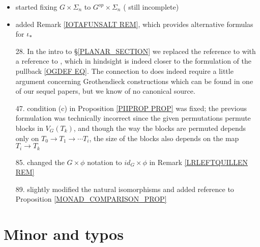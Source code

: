 \documentclass{article}
\begin{document}
\begin{itemize}
	\item started fixing $G \times \Sigma_n$ 
	to 
	$G^{op} \times \Sigma_n$
	({\color{red} still incomplete})
	
	\item added Remark \ref{IOTAFUNSALT REM},
	which provides alternative formulas for
	$\iota_{\**}$
	
	\item[28.] In the intro to \S \ref{PLANAR_SECTION}
	we replaced the reference to 
	\cite[Prop. 5.47]{Pe17}
	with a reference to 
	\cite[Def. 5.44]{Pe17},
	which in hindsight is indeed closer 
	to the formulation of the pullback \eqref{OGDEF EQ}.
	The connection to \cite[Prop. 5.47]{Pe17}
	does indeed require a little argument concerning Grothendieck constructions {\color{red} which can be found in one of our sequel papers}, 
	but we know of no canonical source.
	
	\item[47.] condition (c) in Proposition \ref{PIIPROP PROP}
	was fixed; the previous formulation was technically incorrect since the given permutations
	permute blocks in $V_G(T_k)$,
	and though the way the blocks
	are permuted depends only on 
	$T_0 \to T_1 \to \cdots T_i$,
	the size of the blocks also depends on the map 
	$T_i \to T_k$ 
	
	\item[85.] changed the $G \times \phi$ notation 
	to $id_G \times \phi$ in Remark \ref{LRLEFTQUILLEN REM}
	
	\item[89.] slightly modified the natural isomorphisms and added reference to Proposition \ref{MONAD_COMPARISON_PROP} 
\end{itemize}


\section{Minor and typos} 
\end{document}
